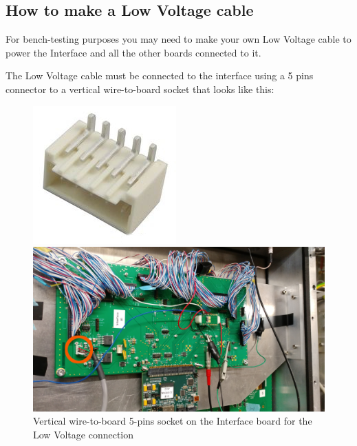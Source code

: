 \subsection{How to make a Low Voltage cable}
For bench-testing purposes you may need to make your own Low Voltage
cable to power the Interface and all the other boards connected to it.

The Low Voltage cable must be connected to the interface using a 5
pins connector to a vertical wire-to-board socket that looks like
this:
\begin{figure}[H]
\centering
\begin{minipage}{0.15\linewidth}
  \centering
  \includegraphics[width=\linewidth,frame]{low-vol-socket1}
\end{minipage}%
\begin{minipage}{0.6\linewidth}
  \centering
  \includegraphics[width=0.9\linewidth,frame]{low-vol-socket2}
\end{minipage}
\caption{Vertical wire-to-board 5-pins socket on the Interface board
  for the Low Voltage connection}\label{low-vol-socket}
\end{figure}
